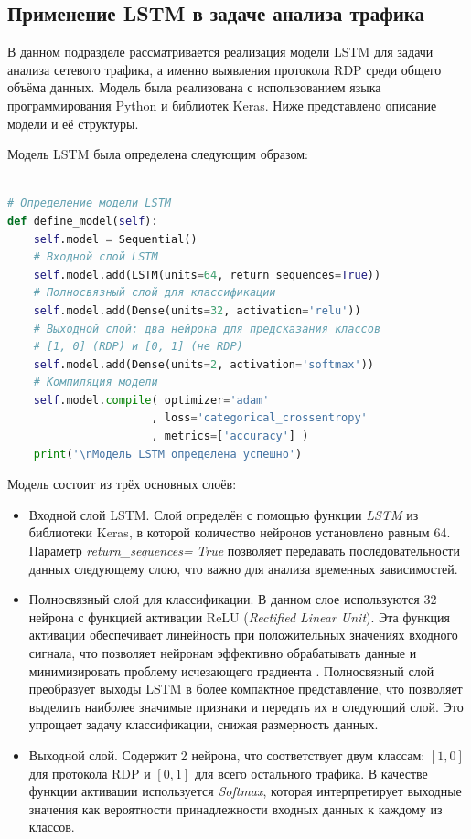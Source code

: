 \documentclass[spec, och, diploma]{SCWorks}
\begin{document}
  \subsection{Применение LSTM в задаче анализа трафика}

В данном подразделе рассматривается реализация модели LSTM для задачи анализа сетевого трафика, а именно выявления протокола RDP среди общего объёма 
данных. Модель была реализована с использованием языка программирования Python и библиотек Keras. Ниже представлено описание модели и её структуры.

Модель LSTM была определена следующим образом:

\begin{lstlisting}[language=Python, caption=Определение модели LSTM, xleftmargin=0.75cm, framexleftmargin=0.75cm]

# Определение модели LSTM
def define_model(self):
    self.model = Sequential()
    # Входной слой LSTM
    self.model.add(LSTM(units=64, return_sequences=True))
    # Полносвязный слой для классификации
    self.model.add(Dense(units=32, activation='relu'))
    # Выходной слой: два нейрона для предсказания классов 
    # [1, 0] (RDP) и [0, 1] (не RDP)
    self.model.add(Dense(units=2, activation='softmax'))
    # Компиляция модели
    self.model.compile( optimizer='adam'
                      , loss='categorical_crossentropy'
                      , metrics=['accuracy'] )
    print('\nМодель LSTM определена успешно')
\end{lstlisting}

Модель состоит из трёх основных слоёв:
\begin{itemize}
    \item Входной слой LSTM. Слой определён с помощью функции \textit{LSTM} из библиотеки Keras, в которой количество нейронов 
    установлено равным 64. Параметр \textit{return\_sequences=} \textit{True} позволяет передавать последовательности 
    данных следующему слою, что важно для анализа временных зависимостей.
    
    \item Полносвязный слой для классификации. В данном слое используются 32 нейрона с функцией активации ReLU (\textit{Rectified Linear Unit}). 
    Эта функция активации обеспечивает линейность при положительных значениях входного сигнала, что позволяет нейронам эффективно обрабатывать данные и 
    минимизировать проблему исчезающего градиента \cite{nn2}. Полносвязный слой преобразует выходы LSTM в более компактное представление, что позволяет выделить 
    наиболее значимые признаки и передать их в следующий слой. Это упрощает задачу классификации, снижая размерность данных.
    
    \item Выходной слой. Содержит 2 нейрона, что соответствует двум классам: \([1, 0]\) для протокола RDP и \([0, 1]\) для всего остального 
    трафика. В качестве функции активации используется \textit{Softmax}, которая интерпретирует выходные значения как вероятности принадлежности входных 
    данных к каждому из классов.
\end{itemize}
\end{document}
